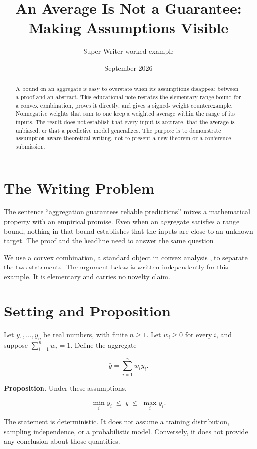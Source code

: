 \documentclass[
  10pt,
  letterpaper,
]{article}
\title{An Average Is Not a Guarantee: Making Assumptions Visible}
\author{Super Writer worked example}
\date{September 2026}
\begin{document}
\maketitle
\begin{abstract}
A bound on an aggregate is easy to overstate when its assumptions
disappear between a proof and an abstract. This educational note
restates the elementary range bound for a convex combination, proves it
directly, and gives a signed- weight counterexample. Nonnegative weights
that sum to one keep a weighted average within the range of its inputs.
The result does not establish that every input is accurate, that the
average is unbiased, or that a predictive model generalizes. The purpose
is to demonstrate assumption-aware theoretical writing, not to present a
new theorem or a conference submission.
\end{abstract}

\section{The Writing Problem}\label{the-writing-problem}

The sentence ``aggregation guarantees reliable predictions'' mixes a
mathematical property with an empirical promise. Even when an aggregate
satisfies a range bound, nothing in that bound establishes that the
inputs are close to an unknown target. The proof and the headline need
to answer the same question.

We use a convex combination, a standard object in convex analysis
\citep{boyd2004}, to separate the two statements. The argument below is
written independently for this example. It is elementary and carries no
novelty claim.

\section{Setting and Proposition}\label{setting-and-proposition}

Let \(y_1,\ldots,y_n\) be real numbers, with finite \(n\geq 1\). Let
\(w_i\geq 0\) for every \(i\), and suppose \(\sum_{i=1}^n w_i=1\).
Define the aggregate

\[
\bar y=\sum_{i=1}^n w_i y_i.
\]

\textbf{Proposition.} Under these assumptions,

\[
\min_i y_i\;\leq\;\bar y\;\leq\;\max_i y_i.
\]

The statement is deterministic. It does not assume a training
distribution, sampling independence, or a probabilistic model.
Conversely, it does not provide any conclusion about those quantities.
\end{document}
